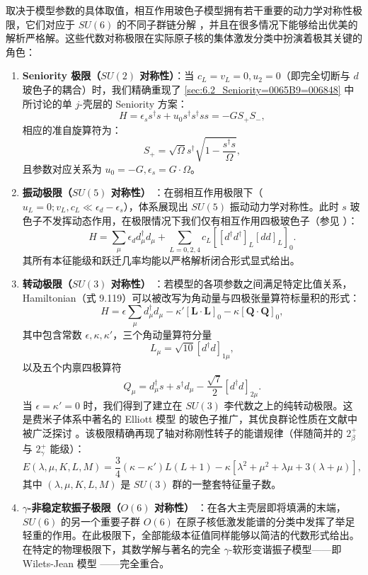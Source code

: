 取决于模型参数的具体取值，相互作用玻色子模型拥有若干重要的动力学对称性极限，它们对应于 $SU(6)$ 的不同子群链分解 \cite{CCF79}，并且在很多情况下能够给出优美的解析严格解。这些代数对称极限在实际原子核的集体激发分类中扮演着极其关键的角色：
\begin{enumerate}
\item \textbf{Seniority 极限（$SU(2)$ 对称性）}：当 $c_{L}=v_{L}=0,u_{2}=0$（即完全切断与
$d$ 玻色子的耦合）时，我们精确重现了 \ref{sec:6.2_Seniority=0065B9=006848} 中所讨论的单
$j$-壳层的 Seniority 方案：
\[
H=\epsilon_{s}s^{\dagger}s+u_{0}s^{\dagger}s^{\dagger}ss=-GS_{+}S_{-},
\]
相应的准自旋算符为：
\[
S_{+}=\sqrt{\Omega}s^{\dagger}\sqrt{1-\frac{s^{\dagger}s}{\Omega}},
\]
且参数对应关系为 $u_{0}=-G,\epsilon_{s}=G\cdot\Omega$。
\item \textbf{振动极限（$SU(5)$ 对称性）} \cite{AI76}：在弱相互作用极限下（$u_{L}=0;v_{L},c_{L}\ll\epsilon_{d}-\epsilon_{s}$），体系展现出
$SU(5)$ 振动动力学对称性。此时 $s$ 玻色子不发挥动态作用，在极限情况下我们仅有相互作用四极玻色子（参见 \cite{BTK65,DDK70,IA74}）：
\begin{equation}
H=\sum_{\mu}\epsilon_{d}d^{\dagger}_{\mu}d_{\mu}+\sum_{L=0,2,4}c_{L}[[d^{\dagger}d^{\dagger}]_{L}[dd]_{L}]_{0}.\label{eq:9.122}
\end{equation}
其所有本征能级和跃迁几率均能以严格解析闭合形式显式给出。
\item \textbf{转动极限（$SU(3)$ 对称性）} \cite{AI78a}：若模型的各项参数之间满足特定比值关系，Hamiltonian（式
9.119）可以被改写为角动量与四极张量算符标量积的形式：
\begin{equation}
H=\epsilon\sum_{\mu}d^{\dagger}_{\mu}d_{\mu}-\kappa'[\boldsymbol{L}\cdot\boldsymbol{L}]_{0}-\kappa[\boldsymbol{Q}\cdot\boldsymbol{Q}]_{0},\label{eq:9.123}
\end{equation}
其中包含常数 $\epsilon,\kappa,\kappa'$，三个角动量算符分量
\[
L_{\mu}=\sqrt{10}[d^{\dagger}d]_{1\mu},
\]
以及五个内禀四极算符
\[
Q_{\mu}=d^{\dagger}_{\mu}s+s^{\dagger}d_{\mu}-\frac{\sqrt{7}}{2}[d^{\dagger}d]_{2\mu}.
\]
当 $\epsilon=\kappa'=0$ 时，我们得到了建立在 $SU(3)$ 李代数之上的纯转动极限。这是费米子体系中著名的
Elliott 模型 \cite{El58} 的玻色子推广，其优良群论性质在文献中被广泛探讨 \cite{Ha68,Ve68,JDJ75}。该极限精确再现了轴对称刚性转子的能谱规律（伴随简并的
$2^{+}_{\beta}$ 与 $2^{+}_{\gamma}$ 能级）：
\[
E(\lambda,\mu,K,L,M)=\frac{3}{4}(\kappa-\kappa')L(L+1)-\kappa\left[\lambda^{2}+\mu^{2}+\lambda\mu+3(\lambda+\mu)\right],
\]
其中 $(\lambda,\mu,K,L,M)$ 是 $SU(3)$ 群的一整套特征量子数。
\item \textbf{$\gamma$-非稳定软振子极限（$O(6)$ 对称性）} \cite{AI78b,CC78,CBP78}：在各大主壳层即将填满的末端，$SU(6)$
的另一个重要子群 $O(6)$ 在原子核低激发能谱的分类中发挥了举足轻重的作用。在此极限下，全部能级本征值同样能够以简洁的代数形式给出。在特定的物理极限下，其数学解与著名的完全
$\gamma$-软形变谐振子模型——即 Wilets-Jean 模型 \cite{WJ56,Me78}——完全重合。
\end{enumerate}
